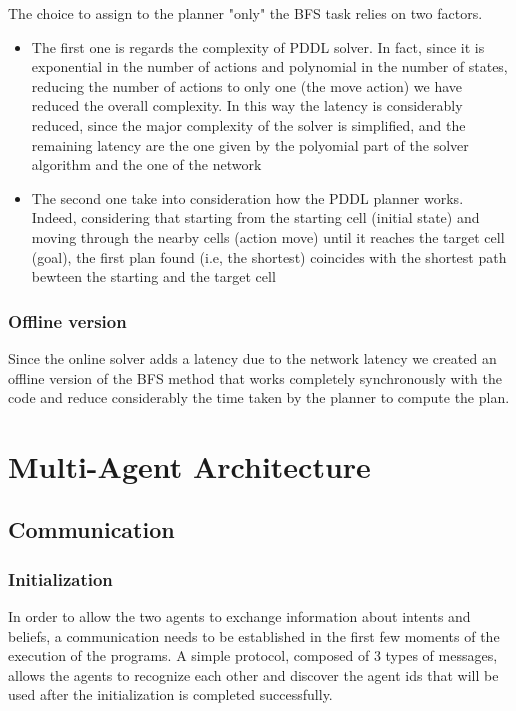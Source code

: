 \documentclass[a4paper, 11pt]{article}
\begin{document}
The choice to assign to the planner "only" the BFS task relies on two factors.
\begin{itemize}
    \item The first one is regards the complexity of PDDL solver. In fact, since it is exponential in the number of actions and polynomial in the number of states, reducing the number of actions to only one (the move action) we have reduced the overall complexity. In this way the latency is considerably reduced, since the major complexity of the solver is simplified, and the remaining latency are the one given by the polyomial part of the solver algorithm and the one of the network
    \item The second one take into consideration how the PDDL planner works. Indeed, considering that starting from the starting cell (initial state) and moving through the nearby cells (action move) until it reaches the target cell (goal), the first plan found (i.e, the shortest) coincides with the shortest path bewteen the starting and the target cell
\end{itemize}

\subsubsection{Offline version}

Since the online solver adds a latency due to the network latency we created an offline version of the BFS method that works completely synchronously with the code and reduce considerably the time taken by the planner to compute the plan.

\pagebreak

\section{Multi-Agent Architecture}

\subsection{Communication}
\subsubsection{Initialization}
In order to allow the two agents to exchange information about intents and beliefs, a communication needs to be established in the first few moments of the execution of the programs. A simple protocol, composed of 3 types of messages, allows the agents to recognize each other and discover the agent ids that will be used after the initialization is completed successfully.
\end{document}
